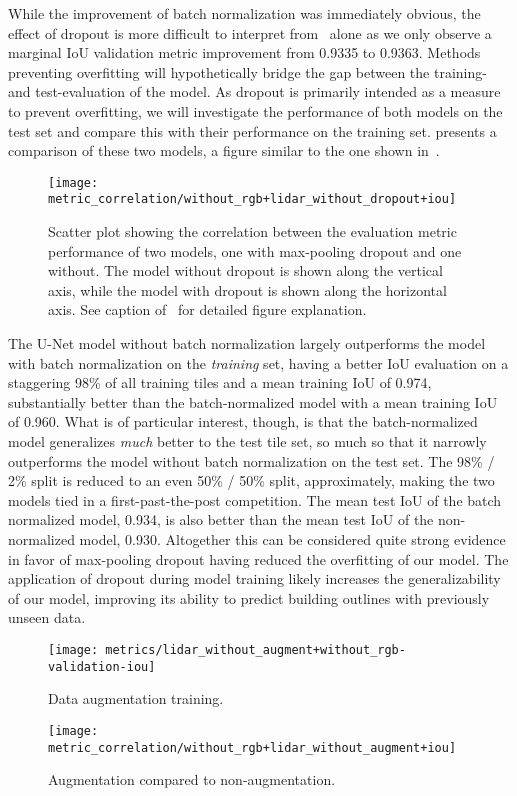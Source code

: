 While the improvement of batch normalization was immediately obvious, the effect of dropout is more difficult to interpret from~ alone as we only observe a marginal IoU validation metric improvement from \num{0.9335} to \num{0.9363}.
Methods preventing overfitting will hypothetically bridge the gap between the training- and test-evaluation of the model.
As dropout is primarily intended as a measure to prevent overfitting, we will investigate the performance of both models on the test set and compare this with their performance on the training set.
 presents a comparison of these two models, a figure similar to the one shown in~.

\begin{figure}[H]
  \centering
  \texttt{[image: metric\_correlation/without\_rgb+lidar\_without\_dropout+iou]}
  \caption{%
    Scatter plot showing the correlation between the evaluation metric performance of two models, one with max-pooling dropout and one without.
    The model without dropout is shown along the vertical axis, while the model with dropout is shown along the horizontal axis.
    See caption of~ for detailed figure explanation.
  }%
  \label{fig:dropout-train-test}
\end{figure}

The U-Net model without batch normalization largely outperforms the model with batch normalization on the \emph{training} set, having a better IoU evaluation on a staggering 98\% of all training tiles and a mean training IoU of \num{0.974}, substantially better than the batch-normalized model with a mean training IoU of \num{0.960}.
What is of particular interest, though, is that the batch-normalized model generalizes \emph{much} better to the test tile set, so much so that it narrowly outperforms the model without batch normalization on the test set.
The 98\% / 2\% split is reduced to an even 50\% / 50\% split, approximately, making the two models tied in a first-past-the-post competition.
The mean test IoU of the batch normalized model, \num{0.934}, is also better than the mean test IoU of the non-normalized model, \num{0.930}.
Altogether this can be considered quite strong evidence in favor of max-pooling dropout having reduced the overfitting of our model.
The application of dropout during model training likely increases the generalizability of our model, improving its ability to predict building outlines with previously unseen data.


\begin{figure}[H]
  \centering
  \texttt{[image: metrics/lidar\_without\_augment+without\_rgb-validation-iou]}
  \caption{%
    Data augmentation training.
  }
\end{figure}

\begin{figure}[H]
  \centering
  \texttt{[image: metric\_correlation/without\_rgb+lidar\_without\_augment+iou]}
  \caption{%
    Augmentation compared to non-augmentation.
  }
\end{figure}

